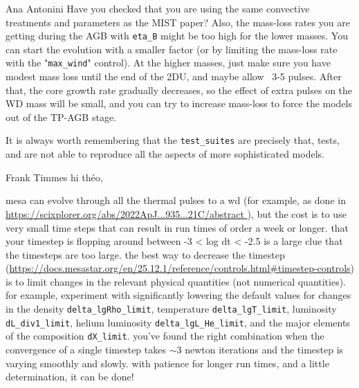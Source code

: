 \documentclass[a4paper,10pt]{article}
\begin{document}
\hspace{0.3\textwidth}\begin{minipage}{1.25\textwidth}
\begin{shadequote}{Ana Antonini}
Have you checked that you are using the same convective treatments and
parameters as the MIST paper?
Also, the mass-loss rates you are getting during the AGB with \lstinline[style=output, breaklines=true]|eta_B| might
be too high for the lower masses. You can start the evolution with a
smaller factor (or by limiting the mass-loss rate with the "\lstinline[style=output, breaklines=true]|max_wind|"
control).
At the higher masses, just make sure you have modest mass loss until the
end of the 2DU, and maybe allow ~3-5 pulses. After that, the core growth
rate gradually decreases, so the effect of extra pulses on the WD mass will
be small, and you can try to increase mass-loss to force the models out of
the TP-AGB stage.

 It is always worth remembering that the \lstinline[style=output, breaklines=true]|test_suites| are precisely that,
tests, and are not able to reproduce all the aspects of more sophisticated
models.
\end{shadequote}
\end{minipage}


\hspace{0.3\textwidth}\begin{minipage}{1.25\textwidth}
\begin{shadequote}{Frank Timmes}
hi théo,

mesa can evolve through all the thermal pulses to a wd (for example, as done in \url{https://scixplorer.org/abs/2022ApJ...935...21C/abstract }), but the cost is to use very small time steps that can result in run times of order a week or longer. that your timestep is flopping around between -3 < log dt <  -2.5 is a large clue that the timesteps are too large. the best way to decrease the timestep (\url{https://docs.mesastar.org/en/25.12.1/reference/controls.html#timestep-controls}) is to limit changes in the relevant physical quantities (not numerical quantities). for example, experiment with significantly lowering the default values for changes in the density \lstinline[style=output, breaklines=true]|delta_lgRho_limit|, temperature \lstinline[style=output, breaklines=true]|delta_lgT_limit|, luminosity \lstinline[style=output, breaklines=true]|dL_div1_limit|, helium luminosity \lstinline[style=output, breaklines=true]|delta_lgL_He_limit|, and the major elements of the composition \lstinline[style=output, breaklines=true]|dX_limit|. you've found the right combination when the convergence of a single timestep takes \(\sim 3\) newton iterations and the timestep is varying smoothly and slowly. with patience for longer run times, and a little determination, it can be done!
\end{shadequote}
\end{minipage}
\end{document}
